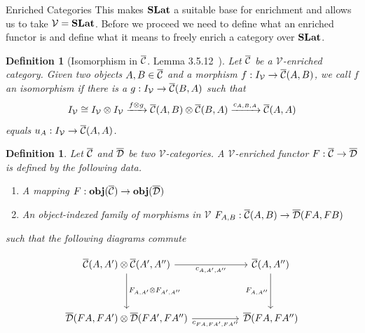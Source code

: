 \documentclass[acmsmall, screen, nonacm]{acmart}
\newtheorem{definition}[theorem]{Definition}
\begin{document}
\begin{section}{Enriched Categories}
This makes $\mathbf{SLat}$ a suitable base for enrichment and allows us to take $\mathcal{V} = \mathbf{SLat}$.
Before we proceed we need to define what an enriched functor is and define what it means to freely enrich a category over $\mathbf{SLat}$.

\begin{definition}[Isomorphism in ${\overline{\mathcal{C}}}$. Lemma 3.5.12~\cite{Riehl_2014}]

Let ${\overline{\mathcal{C}}}$ be a $\mathcal{V}$-enriched category.
Given two objects $A,B \in {\overline{\mathcal{C}}}$ and a morphism $f : I_{\mathcal{V}} \to {\overline{\mathcal{C}}}(A,B)$, we call $f$ an isomorphism if there is a $g : I_{\mathcal{V}} \to {\overline{\mathcal{C}}}(B,A)$ such that
\[
  I_{\mathcal{V}} \cong I_{\mathcal{V}} \otimes I_{\mathcal{V}} \xrightarrow{f \otimes g} {\overline{\mathcal{C}}}(A,B) \otimes {\overline{\mathcal{C}}}(B,A) \xrightarrow{c_{A,B,A}} {\overline{\mathcal{C}}}(A,A)
\]
equals $u_{A} : I_{\mathcal{V}} \to {\overline{\mathcal{C}}}(A,A)$.
\end{definition}


\begin{definition}
  Let ${\overline{\mathcal{C}}}$ and ${\overline{\mathcal{D}}}$ be two $\mathcal{V}$-categories.
  A $\mathcal{V}$-enriched functor $F : {\overline{\mathcal{C}}} \to {\overline{\mathcal{D}}}$ is defined by the following data.
  \begin{enumerate}
    \item A mapping $F : {\mathbf{obj}({\overline{\mathcal{C}}})} \to {\mathbf{obj}({\overline{\mathcal{D}}})}$
    \item An object-indexed family of morphisms in $\mathcal{V}$ $F_{A,B} : {\overline{\mathcal{C}}}(A,B) \to {\overline{\mathcal{D}}}(FA,FB)$
  \end{enumerate}
  such that the following diagrams commute

  \[
  \begin{tikzcd}
	{\enriched{C}(A,A') \otimes \enriched{C}(A',A'')} && {\enriched{C}(A,A'')} \\
	\\
	{\enriched{D}(FA,FA') \otimes \enriched{D}(FA',FA'')} && {\enriched{D}(FA,FA'')}
	\arrow["{c_{A,A',A''}}"', from=1-1, to=1-3]
	\arrow["{F_{A,A'} \otimes F_{A',A''}}", from=1-1, to=3-1]
	\arrow["{F_{A,A''}}"', from=1-3, to=3-3]
	\arrow["{c_{FA,FA',FA''}}"', from=3-1, to=3-3]
\end{tikzcd}
\]


\end{definition}
\end{section}
\end{document}

